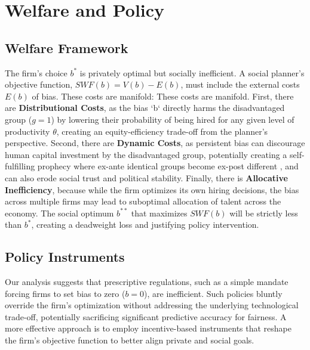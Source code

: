 \section{Welfare and Policy}

\subsection{Welfare Framework}
The firm's choice $b^*$ is privately optimal but socially inefficient. A social planner's objective function, $SWF(b) = V(b) - E(b)$, must include the external costs $E(b)$ of bias. These costs are manifold:
These costs are manifold. First, there are \textbf{Distributional Costs}, as the bias `b` directly harms the disadvantaged group ($g=1$) by lowering their probability of being hired for any given level of productivity $\theta$, creating an equity-efficiency trade-off from the planner's perspective. Second, there are \textbf{Dynamic Costs}, as persistent bias can discourage human capital investment by the disadvantaged group, potentially creating a self-fulfilling prophecy where ex-ante identical groups become ex-post different \citep{Coate1993}, and can also erode social trust and political stability. Finally, there is \textbf{Allocative Inefficiency}, because while the firm optimizes its own hiring decisions, the bias across multiple firms may lead to suboptimal allocation of talent across the economy.
The social optimum $b^{**}$ that maximizes $SWF(b)$ will be strictly less than $b^*$, creating a deadweight loss and justifying policy intervention.

\subsection{Policy Instruments}

Our analysis suggests that prescriptive regulations, such as a simple mandate forcing firms to set bias to zero ($b=0$), are inefficient. Such policies bluntly override the firm's optimization without addressing the underlying technological trade-off, potentially sacrificing significant predictive accuracy for fairness. A more effective approach is to employ incentive-based instruments that reshape the firm's objective function to better align private and social goals.


